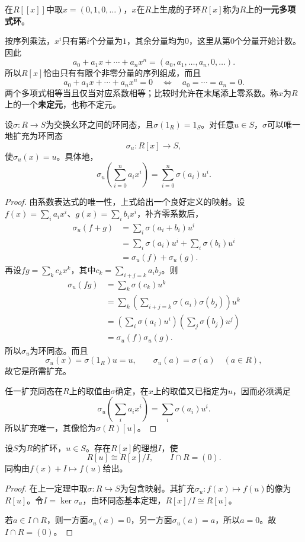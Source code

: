 \begin{definition}
在$R[[x]]$中取$x=(0,1,0,\ldots)$，$x$在$R$上生成的子环$R[x]$称为$R$上的\textbf{一元多项式环}。
\end{definition}

按序列乘法，$x^i$只有第$i$个分量为$1$，其余分量均为$0$，这里从第$0$个分量开始计数。因此
\[
a_0+a_1x+\cdots+a_nx^n=(a_0,a_1,\ldots,a_n,0,\ldots).
\]
所以$R[x]$恰由只有有限个非零分量的序列组成，而且
\[
a_0+a_1x+\cdots+a_nx^n=0
\quad\Longleftrightarrow\quad a_0=\cdots=a_n=0.
\]
两个多项式相等当且仅当对应系数相等；比较时允许在末尾添上零系数。称$x$为$R$上的一个\textbf{未定元}，也称不定元。

\begin{theorem}\label{p2:poly-universal}
设$\sigma:R\to S$为交换幺环之间的环同态，且$\sigma(1_R)=1_S$。对任意$u\in S$，$\sigma$可以唯一地扩充为环同态
\[
\sigma_u:R[x]\to S,
\]
使$\sigma_u(x)=u$。具体地，
\[
\sigma_u\left(\sum_{i=0}^n a_i x^i\right)
=\sum_{i=0}^n\sigma(a_i)u^i.
\]
\end{theorem}
\begin{proof}
由系数表达式的唯一性，上式给出一个良好定义的映射。设$f(x)=\sum_i a_i x^i$、$g(x)=\sum_i b_i x^i$，补齐零系数后，
\begin{align*}
\sigma_u(f+g)
&=\sum_i\sigma(a_i+b_i)u^i\\
&=\sum_i\sigma(a_i)u^i+\sum_i\sigma(b_i)u^i\\
&=\sigma_u(f)+\sigma_u(g).
\end{align*}
再设$fg=\sum_k c_kx^k$，其中$c_k=\sum_{i+j=k}a_i b_j$。则
\begin{align*}
\sigma_u(fg)
&=\sum_k\sigma(c_k)u^k\\
&=\sum_k\left(\sum_{i+j=k}\sigma(a_i)\sigma(b_j)\right)u^k\\
&=\left(\sum_i\sigma(a_i)u^i\right)
  \left(\sum_j\sigma(b_j)u^j\right)\\
&=\sigma_u(f)\sigma_u(g).
\end{align*}
所以$\sigma_u$为环同态。而且
\[
\sigma_u(x)=\sigma(1_R)u=u,\qquad
\sigma_u(a)=\sigma(a)\quad(a\in R),
\]
故它是所需扩充。

任一扩充同态在$R$上的取值由$\sigma$确定，在$x$上的取值又已指定为$u$，因而必须满足
\[
\sigma_u\left(\sum_i a_i x^i\right)=\sum_i\sigma(a_i)u^i.
\]
所以扩充唯一，其像恰为$\sigma(R)[u]$。
\end{proof}

\begin{corollary}
设$S$为$R$的扩环，$u\in S$。存在$R[x]$的理想$I$，使
\[
R[u]\cong R[x]/I,\qquad I\cap R=(0).
\]
同构由$f(x)+I\mapsto f(u)$给出。
\end{corollary}
\begin{proof}
在上一定理中取$\sigma:R\hookrightarrow S$为包含映射。其扩充$\sigma_u:f(x)\mapsto f(u)$的像为$R[u]$。令$I=\ker\sigma_u$，由环同态基本定理，$R[x]/I\cong R[u]$。

若$a\in I\cap R$，则一方面$\sigma_u(a)=0$，另一方面$\sigma_u(a)=a$，所以$a=0$。故$I\cap R=(0)$。
\end{proof}

